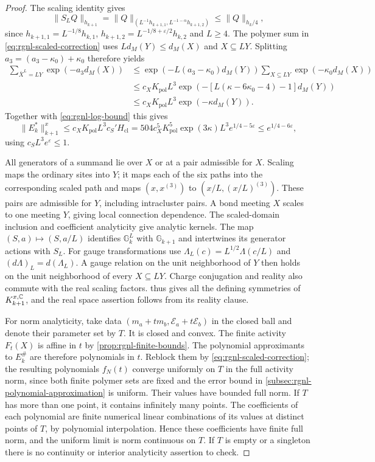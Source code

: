 \begin{proof}
The scaling identity gives
\[
 \|S_LQ\|_{h_{k+1}}
   =\|Q\|_{(L^{-1}h_{k+1,1},L^{-1-\alpha}h_{k+1,2})}
   \le\|Q\|_{h_k/4},
\]
since $h_{k+1,1}=L^{-1/8}h_{k,1}$,
$h_{k+1,2}=L^{-1/8+\varepsilon/2}h_{k,2}$ and $L\ge4$.
The polymer sum in \eqref{eq:rgnl-scaled-correction}
uses $Ld_M(Y)\le d_M(X)$ and $X\subseteq LY$.
Splitting $a_3=(a_3-\kappa_0)+\kappa_0$ therefore yields
\begin{align*}
 \sum_{\bar X^L=LY}\exp(-a_3d_M(X))
  &\le \exp(-L(a_3-\kappa_0)d_M(Y))
                         \sum_{X\subseteq LY}\exp(-\kappa_0d_M(X))\\
  &\le c_XK_{\mathrm{pol}}L^3
                  \exp(-[L(\kappa-6\kappa_0-4)-1]d_M(Y))\\
  &\le c_XK_{\mathrm{pol}}L^3\exp(-\kappa d_M(Y)).
\end{align*}
Together with \eqref{eq:rgnl-log-bound} this gives
\[
 \|E_k^*\|_{k+1}^x
  \le c_XK_{\mathrm{pol}}L^3c_S'H_{\mathrm{cl}}
  =504c_X^5K_{\mathrm{pol}}^5\exp(3\kappa)L^3e^{1/4-5\varepsilon}
  \le e^{1/4-6\varepsilon},
\]
using $c_SL^3e^\varepsilon\le1$.

All generators of a summand lie over $X$ or at a pair
admissible for $X$. Scaling maps the ordinary sites
into $Y$; it maps each of the six paths into the
corresponding scaled path and maps
$(x,x^{(3)})$ to $(x/L,(x/L)^{(3)})$.
These pairs are admissible for $Y$, including
intracluster pairs. A bond meeting $X$ scales to
one meeting $Y$, giving local connection dependence.
The scaled-domain inclusion and coefficient analyticity
give analytic kernels.
The map $(S,a)\mapsto(S,a/L)$ identifies
$\mathbb G_k^L$ with $\mathbb G_{k+1}$ and intertwines
its generator actions with $S_L$. For gauge transformations
use $\Lambda_L(c)=L^{1/2}\Lambda(c/L)$ and
$(d\Lambda)_L=d(\Lambda_L)$.
A gauge relation on the unit neighborhood of $Y$
then holds on the unit neighborhood of every
$X\subseteq LY$. Charge conjugation and reality also
commute with the real scaling factors.
 thus gives all the
defining symmetries of $K_{k+1}^{x,\mathbb C}$, and the real
space assertion follows from its reality clause.

For norm analyticity, take data
$(m_a+t m_b,\mathscr E_a+t\mathscr E_b)$ in the closed
ball and denote their parameter set by $T$.
It is closed and convex. The finite activity $F_t(X)$
is affine in $t$ by \cref{prop:rgnl-finite-bounds}.
The polynomial approximants to $E_k^\#$ are therefore
polynomials in $t$. Reblock them by
\eqref{eq:rgnl-scaled-correction}; the resulting polynomials
$f_N(t)$ converge uniformly on $T$ in the full activity
norm, since both finite polymer sets are fixed and the
error bound in \cref{subsec:rgnl-polynomial-approximation} is uniform.
Their values have bounded full norm.
If $T$ has more than one point, it contains infinitely
many points. The coefficients of each polynomial are
finite numerical linear combinations of its values at
distinct points of $T$, by polynomial interpolation.
Hence these coefficients have finite full norm, and the
uniform limit is norm continuous on $T$.
If $T$ is empty or a singleton there is no continuity
or interior analyticity assertion to check.


\end{proof}
